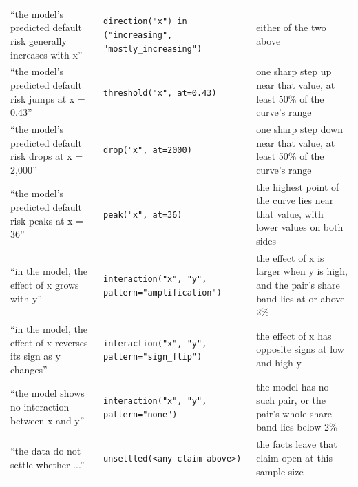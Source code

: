 \begin{tabular}{p{4.6cm}p{4.6cm}p{5.6cm}}
“the model's predicted default risk generally increases with x” & \texttt{direction("x") in ("increasing", "mostly\_increasing")} & either of the two above \\
“the model's predicted default risk jumps at x = 0.43” & \texttt{threshold("x", at=0.43)} & one sharp step up near that value, at least 50\% of the curve's range \\
“the model's predicted default risk drops at x = 2,000” & \texttt{drop("x", at=2000)} & one sharp step down near that value, at least 50\% of the curve's range \\
“the model's predicted default risk peaks at x = 36” & \texttt{peak("x", at=36)} & the highest point of the curve lies near that value, with lower values on both sides \\
“in the model, the effect of x grows with y” & \texttt{interaction("x", "y", pattern="amplification")} & the effect of x is larger when y is high, and the pair's share band lies at or above 2\% \\
“in the model, the effect of x reverses its sign as y changes” & \texttt{interaction("x", "y", pattern="sign\_flip")} & the effect of x has opposite signs at low and high y \\
“the model shows no interaction between x and y” & \texttt{interaction("x", "y", pattern="none")} & the model has no such pair, or the pair's whole share band lies below 2\% \\
“the data do not settle whether ...” & \texttt{unsettled(<any claim above>)} & the facts leave that claim open at this sample size \\
\bottomrule
\end{tabular}
